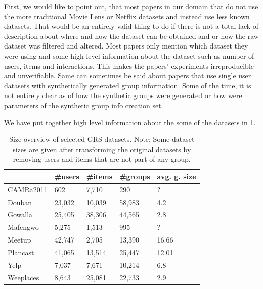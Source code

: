 First, we would like to point out, that most papers in our domain that do not use the more traditional Movie Lens or Netflix datasets and instead use less known datasets. That would be an entirely valid thing to do if there is not a total lack of description about where and how the dataset can be obtained and or how the raw dataset was filtered and altered. Most papers only mention which dataset they were using and some high level information about the dataset such as number of users, items and interactions. This makes the papers' experiments irreproducible and unverifiable. Same can sometimes be said about papers that use single user datasets with synthetically generated group information. Some of the time, it is not entirely clear as of how the synthetic groups were generated or how were parameters of the synthetic group info creation set.

We have put together high level information about the some of the datasets in \ref{table:5.2_GRS_datasets_comparation}.

\begin{table}[!ht]
    \centering
    \begin{tabular}{ l | l l l l }
         & \#users & \#items & \#groups & avg. g. size \\
        \hline
            CAMRa2011\cite{attentative_group_recommendation}
                & 602 & 7,710 & 290 & ? \\
            Douban\cite{gowalla_weeplaces_yelp}
                & 23,032 & 10,039 & 58,983 & 4.2 \\
            Gowalla\cite{gowalla_weeplaces_yelp}
                & 25,405 &  38,306 & 44,565 &  2.8 \\
            Mafengwo\cite{attentative_group_recommendation}
                & 5,275 & 1,513 & 995 & ? \\
            Meetup\cite{meetup_origin}
                & 42,747 & 2,705 & 13,390 & 16.66 \\
            Plancast\cite{meetup_plancast}
                & 41,065 & 13,514 & 25,447 & 12.01 \\
            Yelp\cite{gowalla_weeplaces_yelp}
                & 7,037 & 7,671 & 10,214 & 6.8 \\
            Weeplaces\cite{gowalla_weeplaces_yelp}
                &  8,643 & 25,081 & 22,733 & 2.9 \\
    \end{tabular}
    \caption[Size overview of selected GRS datasets]{Size overview of selected GRS datasets. Note: Some dataset sizes are given after transforming the original datasets by removing users and items that are not part of any group.}
    \label{table:5.2_GRS_datasets_comparation}
\end{table}


